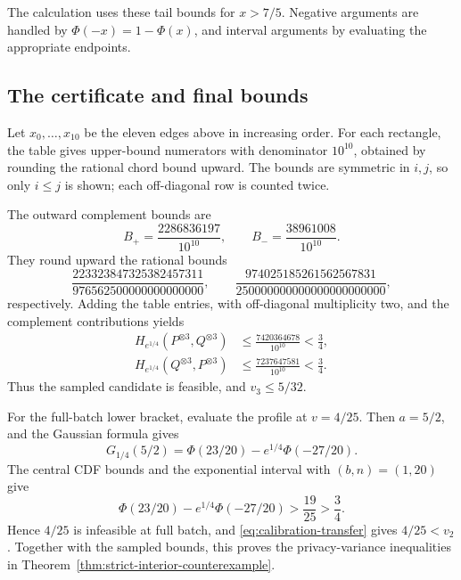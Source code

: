 \documentclass[11pt]{article}
\theoremstyle{remark}
\begin{document}
The calculation uses these tail bounds for $x>7/5$. Negative arguments are
handled by $\Phi(-x)=1-\Phi(x)$, and interval arguments by evaluating the
appropriate endpoints.

\subsection{The certificate and final bounds}
Let $x_0,\ldots,x_{10}$ be the eleven edges above in increasing order.
For each rectangle, the table gives upper-bound numerators with denominator
$10^{10}$, obtained by rounding the rational chord bound upward. The bounds
are symmetric in $i,j$, so only $i\leq j$ is shown; each off-diagonal row
is counted twice.

The outward complement bounds are
\[
 B_+=\frac{2286836197}{10^{10}},\qquad
 B_-=\frac{38961008}{10^{10}}.
\]
They round upward the rational bounds
\[
 \frac{223323847325382457311}{976562500000000000000},\qquad
 \frac{974025185261562567831}{250000000000000000000000},
\]
respectively. Adding the table entries, with off-diagonal multiplicity two,
and the complement contributions yields
\begin{align}
 H_{e^{1/4}}(P^{\otimes3}, Q^{\otimes3})
 &\leq\frac{7420364678}{10^{10}}<\frac34,
 \label{eq:rational-forward-total}\\
 H_{e^{1/4}}(Q^{\otimes3}, P^{\otimes3})
 &\leq\frac{7237647581}{10^{10}}<\frac34.
 \label{eq:rational-reverse-total}
\end{align}
Thus the sampled candidate is feasible, and $v_3\leq5/32$.

For the full-batch lower bracket, evaluate the profile at $v=4/25$. Then
$a=5/2$, and the Gaussian formula gives
\[
 G_{1/4}(5/2)=\Phi(23/20)-e^{1/4}\Phi(-27/20).
\]
The central CDF bounds and the exponential interval with $(b,n)=(1,20)$ give
\[
 \Phi(23/20)-e^{1/4}\Phi(-27/20)>\frac{19}{25}>\frac34.
\]
Hence $4/25$ is infeasible at full batch, and
\eqref{eq:calibration-transfer} gives $4/25<v_2$. Together with the sampled
bounds, this proves the privacy-variance inequalities in
Theorem~\ref{thm:strict-interior-counterexample}.
\end{document}
